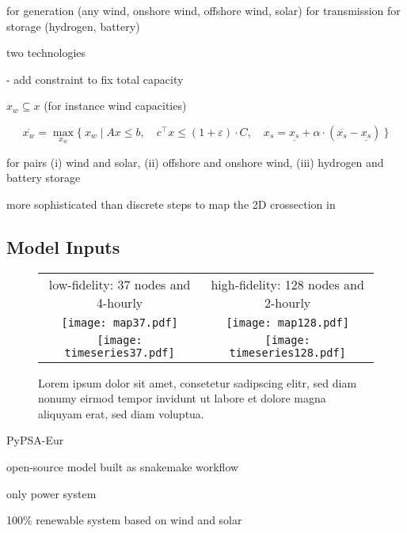 for generation (any wind, onshore wind, offshore wind, solar)
for transmission
for storage (hydrogen, battery)

two technologies

- add constraint to fix total capacity

$x_w\subseteq x$ (for instance wind capacities)

\begin{equation}
    \overline{x_w} = \max_{x_w}\{\:x_w \mid Ax\leq b,\quad c^\top x\leq (1+\varepsilon)\cdot C, \quad x_s = \underline{x_s} + \alpha \cdot (\overline{x_s}-\underline{x_s}) \:\}
\end{equation}

for pairs
(i) wind and solar,
(ii) offshore and onshore wind,
(iii) hydrogen and battery storage

more sophisticated than discrete steps to map the 2D crossection in \cite{pedersen_modeling_2020}


\subsection{Model Inputs}


\begin{SCfigure}
    \begin{tabular}{cc}
        \footnotesize low-fidelity: 37 nodes and 4-hourly & \footnotesize high-fidelity: 128 nodes and 2-hourly \\
        \texttt{[image: map37.pdf]} &
        \texttt{[image: map128.pdf]} \\
        \texttt{[image: timeseries37.pdf]} &
        \texttt{[image: timeseries128.pdf]} \\
    \end{tabular}
    \caption{Lorem ipsum dolor sit amet, consetetur sadipscing elitr, sed diam nonumy eirmod tempor invidunt ut labore et dolore magna aliquyam erat, sed diam voluptua.}
\end{SCfigure}

PyPSA-Eur \cite{pypsa} \cite{pypsaeur} \cite{hoersch_spatial_2017} 

open-source model built as snakemake workflow \cite{snakemake}

only power system

100\% renewable system based on wind and solar

